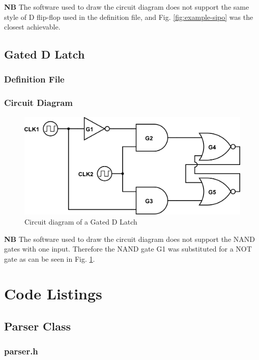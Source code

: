 \documentclass[a4paper,10pt]{article}
\begin{document}
\textbf{NB} The software used to draw the circuit diagram does not support the same style of D flip-flop used in the definition file, and Fig. \ref{fig:example-sipo} was the closest achievable.

\subsection{Gated D Latch}
\subsubsection{Definition File}

\subsubsection{Circuit Diagram}
\begin{figure}[h]
 \centering
 \includegraphics[width=12cm]{../../examples/gated-d-latch.png}
 \caption{Circuit diagram of a Gated D Latch}
 \label{fig:example-dlatch}
\end{figure}

\textbf{NB} The software used to draw the circuit diagram does not support the NAND gates with one input. Therefore the NAND gate G1 was substituted for a NOT gate as can be seen in Fig. \ref{fig:example-dlatch}.

\pagebreak

\section{Code Listings}
\subsection{Parser Class}
\subsubsection{parser.h}

\end{document}
